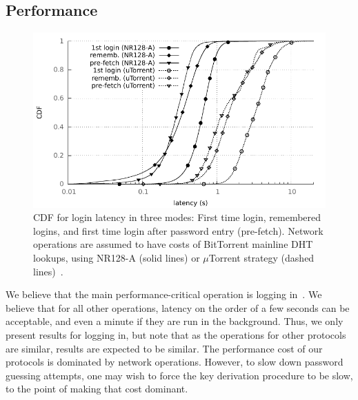 \subsection{Performance}


\begin{figure}
 \centering
 \includegraphics[width=.88\textwidth]{images/passwords-peer-to-peer/latencyCDF}
 \caption{CDF for login latency in three modes: First time login,
remembered logins, and first time login after password entry (pre-fetch). Network 
operations are assumed to have costs of BitTorrent mainline DHT lookups,
using NR128-A (solid lines) or $\mu$Torrent strategy (dashed lines)~\cite{JimenezOK11}.} 
\end{figure}

We believe that the main performance-critical operation is logging
in~\cite{Rushinek86}. We believe that for all other operations,
latency on the order of a few seconds can be acceptable, and even a minute if they are run in the background. Thus, we only present results for logging in, but note
that as the operations for other protocols are similar, results are
expected to be similar. The performance cost of our protocols is
dominated by network operations. However, to slow down password
guessing attempts, one may wish to force the key derivation procedure
to be slow, to the point of making that cost dominant.

